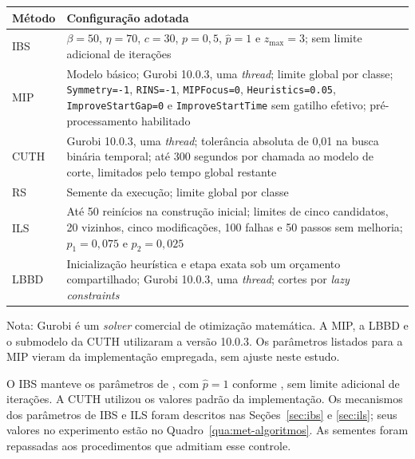 \begin{quadro}[htbp]
\centering
\caption{Configurações dos métodos no experimento comparativo.}
\label{qua:met-algoritmos}
\begin{singlespace}
\normalsize
\begin{tabular}{|p{1.5cm}|p{11.5cm}|}
\hline
\textbf{Método} & \textbf{Configuração adotada} \\
\hline
IBS & $\beta=50$, $\eta=70$, $c=30$, $p=0{,}5$, $\hat{p}=1$ e $z_{\max}=3$; sem limite adicional de iterações \\
\hline
MIP & Modelo básico; Gurobi 10.0.3, uma \textit{thread}; limite global por classe; \texttt{Symmetry=-1}, \texttt{RINS=-1}, \texttt{MIPFocus=0}, \texttt{Heuristics=0.05}, \texttt{ImproveStartGap=0} e \texttt{ImproveStartTime} sem gatilho efetivo; pré-processamento habilitado \\
\hline
CUTH & Gurobi 10.0.3, uma \textit{thread}; tolerância absoluta de 0,01 na busca binária temporal; até 300 segundos por chamada ao modelo de corte, limitados pelo tempo global restante \\
\hline
RS & Semente da execução; limite global por classe \\
\hline
ILS & Até 50 reinícios na construção inicial; limites de cinco candidatos, 20 vizinhos, cinco modificações, 100 falhas e 50 passos sem melhoria; $p_1=0{,}075$ e $p_2=0{,}025$ \\
\hline
LBBD & Inicialização heurística e etapa exata sob um orçamento compartilhado; Gurobi 10.0.3, uma \textit{thread}; cortes por \textit{lazy constraints} \\
\hline
\end{tabular}
\par\smallskip
{\small Nota: Gurobi é um \textit{solver} comercial de otimização matemática. A MIP, a LBBD e o submodelo da CUTH utilizaram a versão 10.0.3. Os parâmetros listados para a MIP vieram da implementação empregada, sem ajuste neste estudo.\par}
{}
\end{singlespace}
\end{quadro}

O IBS manteve os parâmetros de , com
$\hat p=1$ conforme , sem limite adicional
de iterações. A CUTH utilizou os valores padrão da implementação.
Os mecanismos dos parâmetros de IBS e ILS foram descritos nas
Seções~\ref{sec:ibs} e \ref{sec:ils}; seus valores no experimento estão
no Quadro~\ref{qua:met-algoritmos}. As sementes foram repassadas aos
procedimentos que admitiam esse controle.

